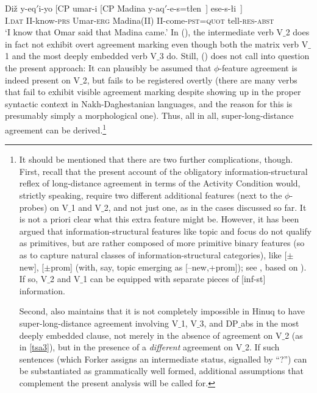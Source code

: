 \documentclass[output=paper
,modfonts
,nonflat]{langsci/langscibook}
\begin{document}
\ea\label{ex:mueller:36} 
\gll Di\v{z} \label{tsa3}y-eq$'$i-yo [CP \textglotstop umar-i [CP Madina  y-aq$'$-e-s=t\l en~] ese-s-\l i~]\\
I.{\scshape dat} II-know-{\scshape prs} {} Umar-{\scshape erg} {} Madina(II) II-come-{\scshape pst}={\scshape quot} tell-{\scshape res}-{\scshape abst}\\
\glt `I know that Omar said that Madina came.'
\z
In (\Last), the intermediate verb V$\_$2 does in fact not exhibit overt
agreement marking even though both the matrix verb V$\_$1 and the most
deeply embedded verb V$\_$3 do. Still, (\Last) does not call into question
the present approach: It can plausibly be assumed that $\phi$-feature
agreement is indeed present on V$\_$2, but fails to be registered overtly
(there are many verbs that fail to exhibit visible agreement marking
despite showing up in the proper syntactic context in
Nakh-Daghestanian languages, and the reason for this is presumably
simply a morphological one). Thus, all in all, super-long-distance
agreement can be derived.\footnote{It should be mentioned that there
  are two further complications, though. First, recall that the
  present account of the obligatory information-structural reflex of
  long-distance agreement in terms of the Activity Condition would,
  strictly speaking, require two different additional features (next
  to the $\phi$-probes) on V$\_$1 and V$\_$2, and not just one, as in the
  cases discussed so far. It is not a priori clear what
  this extra feature might be. However, it has been argued that
  information-structural features like topic and focus do not qualify
  as primitives, but are rather composed of more primitive binary
  features (so as to capture natural classes of information-structural
  categories), like [$\pm$new], [$\pm$prom] (with, say, topic emerging
  as [--new,+prom]); see \cite{Choi:99}, based on
  \cite{Vallduvi:92}). If so, V$\_$2 and V$\_$1 can be equipped with
  separate pieces of [inf-st] information.

Second, \cite{Forker:11} also maintains that it is not completely
impossible in Hinuq to have super-long-distance agreement involving
V$\_$1, V$\_$3, and DP$\_${abs} in the most deeply embedded clause, not merely
in the absence of agreement on V$\_$2 (as in \ref{tsa3}), but in the presence of a {\it
  different} agreement on V$\_$2.  If such sentences (which  Forker assigns
an intermediate status, signalled by ``?'') can be substantiated as
grammatically well formed, additional assumptions that complement the
present analysis will be called for.}
\end{document}
